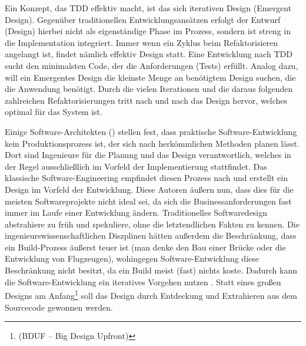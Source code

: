 Ein Konzept, das TDD effektiv macht, ist das sich iterativen Design (Emergent Design). Gegenüber traditionellen Entwicklungsansätzen erfolgt der Entwurf (Design) hierbei nicht als eigenständige Phase im Prozess, sondern ist streng in die Implementation integriert. Immer wenn ein Zyklus beim Refaktorisieren angelangt ist, findet nämlich effektiv Design statt. Eine Entwicklung nach TDD sucht den minimalsten Code, der die Anforderungen (Tests) erfüllt. Analog dazu, will ein Emergentes Design die kleinste Menge an benötigtem Design suchen, die die Anwendung benötigt. Durch die vielen Iterationen und die daraus folgenden zahlreichen Refaktorisierungen tritt nach und nach das Design hervor, welches optimal für das System ist.


Einige Software-Architekten (\cite{neal_ford_emergent_2010,jack_reeves_three_1992,glenn_vanderburg_real_2010}) stellen fest, dass praktische Software\hyp{}Entwicklung kein Produktionsprozess ist, der sich nach herkömmlichen Methoden planen lässt. Dort sind Ingenieure für die Planung und das Design verantwortlich, welches in der Regel ausschließlich im Vorfeld der Implementierung stattfindet. Das klassische Software-Engineering empfindet diesen Prozess nach und erstellt ein Design im Vorfeld der Entwicklung. Diese Autoren äußern nun, dass dies für die meisten Softwareprojekte nicht ideal sei, da sich die Businessanforderungen fast immer im Laufe einer Entwicklung ändern. Traditionelles Softwaredesign abstrahiere zu früh und spekuliere, ohne die letztendlichen Fakten zu kennen. Die ingenieurswissenschaftlichen Diszplinen hätten außerdem die Beschränkung, dass ein Build-Prozess äußerst teuer ist (man denke den Bau einer Brücke oder die Entwicklung von Flugzeugen), wohingegen Software-Entwicklung diese Beschränkung nicht besitzt, da ein Build meist (fast) nichts koste. Dadurch kann die Software-Entwicklung ein iteratives Vorgehen nutzen \cite{neal_ford_emergent_2010,glenn_vanderburg_real_2010,jack_reeves_three_1992}. Statt eines großen Designs am Anfang\footnote{(BDUF -- Big Design Upfront)} soll das Design durch Entdeckung und Extrahieren aus dem Sourcecode gewonnen werden.


